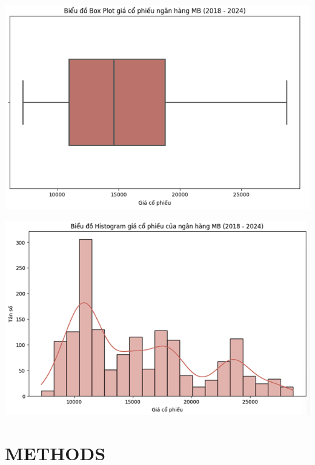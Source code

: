 \documentclass[conference]{IEEEtran}
\begin{document}
\begin{minipage}{0.23\textwidth}
    \centering
    \includegraphics[width=\linewidth]{images/Statistic/mbb_boxplot.png}
    \label{fig:image1}
\end{minipage}
\hfill
\begin{minipage}{0.23\textwidth}
    \centering
    \includegraphics[width=\linewidth]{images/Statistic/mbb_histogram.png}
    \label{fig:image2}
\end{minipage}



\section{METHODS}
\end{document}
